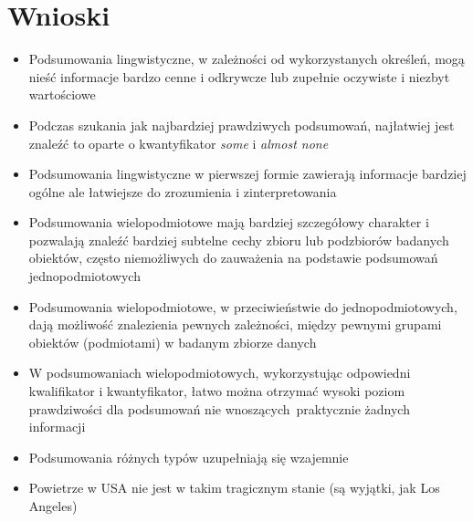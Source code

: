 \documentclass{classrep}
\begin{document}
    \section{Wnioski} {
        \begin{itemize}
            \item Podsumowania lingwistyczne, w zależności od wykorzystanych
                określeń, mogą nieść informacje bardzo cenne i odkrywcze lub
                zupełnie oczywiste i niezbyt wartościowe
            \item Podczas szukania jak najbardziej prawdziwych podsumowań,
                najłatwiej jest znaleźć to oparte o kwantyfikator \emph{some} i
                \emph{almost none}
            \item Podsumowania lingwistyczne w pierwszej formie zawierają
                informacje bardziej ogólne ale łatwiejsze do zrozumienia i
                zinterpretowania
            \item Podsumowania wielopodmiotowe mają bardziej szczegółowy charakter
                i pozwalają znaleźć bardziej subtelne cechy zbioru lub podzbiorów
                badanych obiektów, często niemożliwych do zauważenia na podstawie
                podsumowań jednopodmiotowych
            \item Podsumowania wielopodmiotowe, w przeciwieństwie do
                jednopodmiotowych, dają możliwość znalezienia pewnych zależności,
                między pewnymi grupami obiektów (podmiotami) w badanym zbiorze
                danych
            \item W podsumowaniach wielopodmiotowych, wykorzystując odpowiedni
                kwalifikator i kwantyfikator, łatwo można otrzymać wysoki poziom
                prawdziwości dla podsumowań nie wnoszących praktycznie żadnych
                informacji
            \item Podsumowania różnych typów uzupełniają się wzajemnie
            \item Powietrze w USA nie jest w takim tragicznym stanie (są
                wyjątki, jak Los Angeles)
        \end{itemize}
    }
\end{document}
